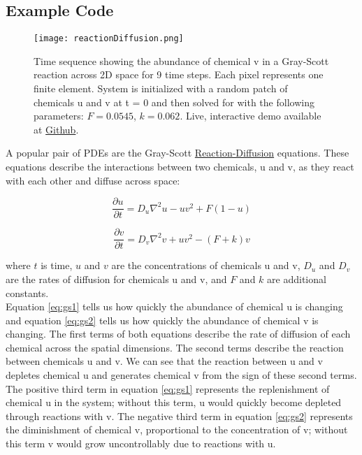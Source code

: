 {\subsection{Example Code}

\begin{figure}
  \texttt{[image: reactionDiffusion.png]}
  \caption{Time sequence showing the abundance of chemical v in a Gray-Scott reaction across 2D space for 9 time steps.  Each pixel represents one finite element.  System is initialized with a random patch of chemicals u and v at t = 0 and then solved for with the following parameters: $F = 0.0545$, $k=0.062$.  Live, interactive demo available at \href{http://git.amandaghassaei.com/ReactionDiffusionShader/}{Github}.}
  \label{fig:grayScott}
\end{figure}

A popular pair of PDEs are the Gray-Scott \href{https://en.wikipedia.org/wiki/Reaction%E2%80%93diffusion_system#Two-component_reaction.E2.80.93diffusion_equations}{Reaction-Diffusion} equations.  These equations describe the interactions between two chemicals, u and v, as they react with each other and diffuse across space:

 \begin{equation}\label{eq:gs1}
  \frac{\partial u}{\partial t} = D_{u}\nabla^{2} u -uv^{2} + F(1-u)
  \end{equation}
  
   \begin{equation}\label{eq:gs2}
  \frac{\partial v}{\partial t} = D_{v}\nabla^{2} v +uv^{2} - (F+k)v
  \end{equation}
  
  where $t$ is time, $u$ and $v$ are the concentrations of chemicals u and v, $D_{u}$ and $D_{v}$ are the rates of diffusion for chemicals u and v, and $F$ and $k$ are additional constants.  \\
  
  Equation \ref{eq:gs1} tells us how quickly the abundance of chemical u is changing and equation \ref{eq:gs2} tells us how quickly the abundance of chemical v is changing.  The first terms of both equations describe the rate of diffusion of each chemical across the spatial dimensions.  The second terms describe the reaction between chemicals u and v.  We can see that the reaction between u and v depletes chemical u and generates chemical v from the sign of these second terms.  The positive third term in equation \ref{eq:gs1} represents the replenishment of chemical u in the system; without this term, u would quickly become depleted through reactions with v.  The negative third term in equation \ref{eq:gs2} represents the diminishment of chemical v, proportional to the concentration of v; without this term v would grow uncontrollably due to reactions with u.\\
  
}
